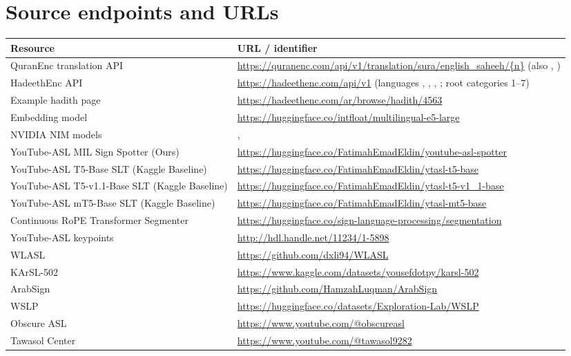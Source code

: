 \chapter{Source endpoints and URLs}
\label{app:urls}
\begin{longtable}{L{4.3cm} L{11.2cm}}
\toprule
Resource & URL / identifier \\
\midrule
\endhead
QuranEnc translation API & \url{https://quranenc.com/api/v1/translation/sura/english_saheeh/{n}} (also , ) \\
HadeethEnc API & \url{https://hadeethenc.com/api/v1} (languages , , , ; root categories 1--7) \\
Example hadith page & \url{https://hadeethenc.com/ar/browse/hadith/4563} \\
Embedding model & \url{https://huggingface.co/intfloat/multilingual-e5-large} \\
NVIDIA NIM models & ,  \cite{nvidianim} \\
YouTube-ASL MIL Sign Spotter (Ours) & \url{https://huggingface.co/FatimahEmadEldin/youtube-asl-spotter} \\
YouTube-ASL T5-Base SLT (Kaggle Baseline) & \url{https://huggingface.co/FatimahEmadEldin/ytasl-t5-base} \\
YouTube-ASL T5-v1.1-Base SLT (Kaggle Baseline) & \url{https://huggingface.co/FatimahEmadEldin/ytasl-t5-v1_1-base} \\
YouTube-ASL mT5-Base SLT (Kaggle Baseline) & \url{https://huggingface.co/FatimahEmadEldin/ytasl-mt5-base} \\
Continuous RoPE Transformer Segmenter & \url{https://huggingface.co/sign-language-processing/segmentation} \\
YouTube-ASL keypoints & \url{http://hdl.handle.net/11234/1-5898} \\
WLASL & \url{https://github.com/dxli94/WLASL} \\
KArSL-502 & \url{https://www.kaggle.com/datasets/yousefdotpy/karsl-502} \\
ArabSign & \url{https://github.com/HamzahLuqman/ArabSign} \\
WSLP & \url{https://huggingface.co/datasets/Exploration-Lab/WSLP} \\
Obscure ASL & \url{https://www.youtube.com/@obscureasl} \\
Tawasol Center & \url{https://www.youtube.com/@tawasol9282} \\

\end{longtable}
